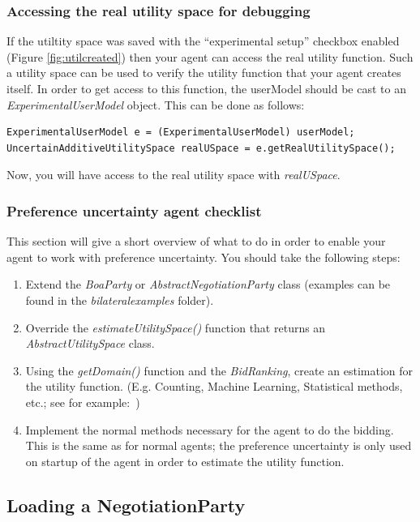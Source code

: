 \documentclass[]{llncs}
\begin{document}
\subsubsection{Accessing the real utility space for debugging}
If the utiltity space was saved with the ``experimental setup'' checkbox enabled (Figure \ref{fig:utilcreated}) then your agent can access the real utility function. Such a utility space can be used to verify the utility function that your agent creates itself. In order to get access to this function, the userModel should be cast to an \textit{ExperimentalUserModel} object. This can be done as follows:
\begin{lstlisting}
ExperimentalUserModel e = (ExperimentalUserModel) userModel;
UncertainAdditiveUtilitySpace realUSpace = e.getRealUtilitySpace();
\end{lstlisting}

Now, you will have access to the real utility space with \textit{realUSpace}.

\subsubsection{Preference uncertainty agent checklist}
This section will give a short overview of what to do in order to enable your agent to work with preference uncertainty. You should take the following steps:
\begin{enumerate}
    \item Extend the \textit{BoaParty} or \textit{AbstractNegotiationParty} class (examples can be found in the \textit{bilateralexamples} folder).
    \item Override the \textit{estimateUtilitySpace()} function that returns an \textit{AbstractUtilitySpace} class.
    \item Using the \textit{getDomain()} function and the \textit{BidRanking}, create an estimation for the utility function. (E.g. Counting, Machine Learning, Statistical methods, etc.; see for example:~\cite{Ayd14,BaarslagValueOfInformation,UTAGMS,Ros16,Sri73,Tsi18,Zin18})
    \item Implement the normal methods necessary for the agent to do the bidding. This is the same as for normal agents; the preference uncertainty is only used on startup of the agent in order to estimate the utility function.
\end{enumerate}


\subsection{Loading a NegotiationParty}
\end{document}
